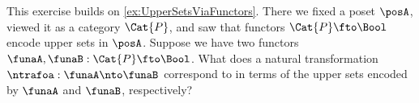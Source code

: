 \begin{marginfigure}
\begin{center}
\end{center}
\caption{}
  \label{fig:graph-cat-again}
\end{marginfigure}



\begin{gradedexercise}\label{ex:UpperSetsNatTrafos}
This exercise builds on \cref{ex:UpperSetsViaFunctors}. There we fixed a poset $\posA$, viewed it as a category $\Cat{P}$, and saw that functors $\Cat{P} \fto \Bool$ encode upper sets in $\posA$. Suppose we have two functors $\funaA, \funaB : \Cat{P} \fto \Bool$. What does a natural transformation $\ntrafoa : \funaA \nto \funaB$ correspond to in terms of the upper sets encoded by $\funaA$ and $\funaB$, respectively?
\end{gradedexercise}






